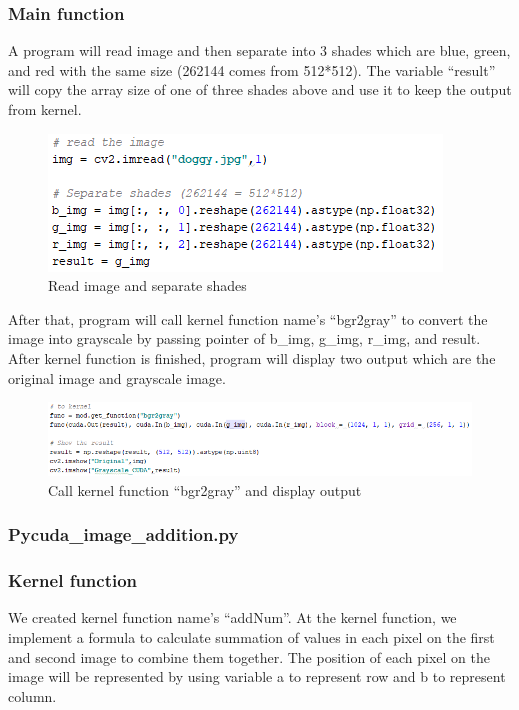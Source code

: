 \documentclass[11pt]{article}
\begin{document}
\subsubsection*{Main function}
A program will read image and then separate into 3 shades which are blue, green, and red with the same size (262144 comes from 512*512). The variable “result” will copy the array size of one of three shades above and use it to keep the output from kernel. 

\begin{figure}[h]
\centering
\includegraphics[scale=0.7]{bgr2}
\caption{Read image and separate shades}
\end{figure}


After that, program will call kernel function name’s “bgr2gray” to convert the image into grayscale by passing pointer of b\_img, g\_img, r\_img, and result. After kernel function is finished, program will display two output which are the original image and grayscale image\cite{Ashwin}.

\begin{figure}[h]
\centering
\includegraphics[scale=0.7]{bgr3}
\caption{Call kernel function “bgr2gray” and display output}
\end{figure}


\newpage
\subsubsection{Pycuda\_image\_addition.py}
\subsubsection*{Kernel function}
We created kernel function name’s “addNum”. At the kernel function, we implement a formula to calculate summation of values in each pixel on the first and second image to combine them together. The position of each pixel on the image will be represented by using variable a to represent row and b to represent column.
\end{document}
